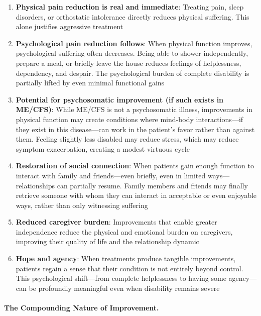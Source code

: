 \begin{enumerate}
    \item \textbf{Physical pain reduction is real and immediate}: Treating pain, sleep disorders, or orthostatic intolerance directly reduces physical suffering. This alone justifies aggressive treatment

    \item \textbf{Psychological pain reduction follows}: When physical function improves, psychological suffering often decreases. Being able to shower independently, prepare a meal, or briefly leave the house reduces feelings of helplessness, dependency, and despair. The psychological burden of complete disability is partially lifted by even minimal functional gains

    \item \textbf{Potential for psychosomatic improvement (if such exists in ME/CFS)}: While ME/CFS is not a psychosomatic illness, improvements in physical function may create conditions where mind-body interactions---if they exist in this disease---can work in the patient's favor rather than against them. Feeling slightly less disabled may reduce stress, which may reduce symptom exacerbation, creating a modest virtuous cycle

    \item \textbf{Restoration of social connection}: When patients gain enough function to interact with family and friends---even briefly, even in limited ways---relationships can partially resume. Family members and friends may finally retrieve someone with whom they can interact in acceptable or even enjoyable ways, rather than only witnessing suffering

    \item \textbf{Reduced caregiver burden}: Improvements that enable greater independence reduce the physical and emotional burden on caregivers, improving their quality of life and the relationship dynamic

    \item \textbf{Hope and agency}: When treatments produce tangible improvements, patients regain a sense that their condition is not entirely beyond control. This psychological shift---from complete helplessness to having some agency---can be profoundly meaningful even when disability remains severe
\end{enumerate}

\paragraph{The Compounding Nature of Improvement.}

